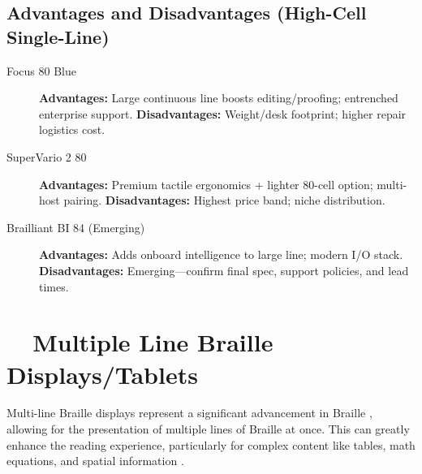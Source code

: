 \subsection*{Advantages and Disadvantages (High-Cell Single-Line)}
\begin{description}
	\item[Focus 80 Blue] \textbf{Advantages:} Large continuous line boosts editing/proofing; entrenched enterprise support. \textbf{Disadvantages:} Weight/desk footprint; higher repair logistics cost.
	\item[SuperVario 2 80] \textbf{Advantages:} Premium tactile ergonomics + lighter 80-cell option; multi-host pairing. \textbf{Disadvantages:} Highest price band; niche distribution.
	\item[Brailliant BI 84 (Emerging)] \textbf{Advantages:} Adds onboard intelligence to large line; modern I/O stack. \textbf{Disadvantages:} Emerging—confirm final spec, support policies, and lead times.
\end{description}


\section{~~Multiple Line Braille Displays/Tablets}\label{ch3:sec:multi-line}
Multi-line Braille displays represent a significant advancement in Braille , allowing for the presentation of multiple lines of Braille at once. This can greatly enhance the reading experience, particularly for complex content like tables, math equations, and spatial information \supercite{Behrmann2012, Lueck2016, TactileSkillsDevelopment}.

